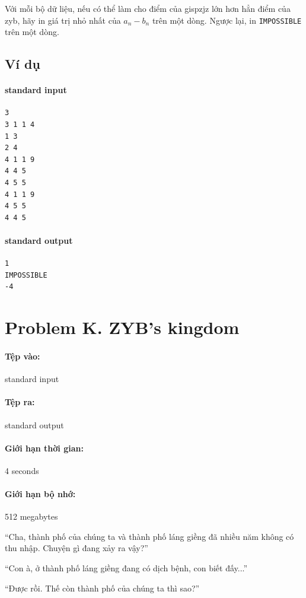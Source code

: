 \documentclass[11pt]{article}
\begin{document}
Với mỗi bộ dữ liệu, nếu có thể làm cho điểm của gispzjz lớn hơn hẳn điểm của
zyb, hãy in giá trị nhỏ nhất của \(a_n-b_n\) trên một dòng. Ngược lại, in
\texttt{IMPOSSIBLE} trên một dòng.

\subsection*{Ví dụ}

\paragraph{standard input}
\begin{verbatim}
3
3 1 1 4
1 3
2 4
4 1 1 9
4 4 5
4 5 5
4 1 1 9
4 5 5
4 4 5
\end{verbatim}

\paragraph{standard output}
\begin{verbatim}
1
IMPOSSIBLE
-4
\end{verbatim}

\section{Problem K. ZYB's kingdom}

\paragraph{Tệp vào:} standard input
\paragraph{Tệp ra:} standard output
\paragraph{Giới hạn thời gian:} 4 seconds
\paragraph{Giới hạn bộ nhớ:} 512 megabytes

``Cha, thành phố của chúng ta và thành phố láng giềng đã nhiều năm không có
thu nhập. Chuyện gì đang xảy ra vậy?''

``Con à, ở thành phố láng giềng đang có dịch bệnh, con biết đấy...''

``Được rồi. Thế còn thành phố của chúng ta thì sao?''
\end{document}
